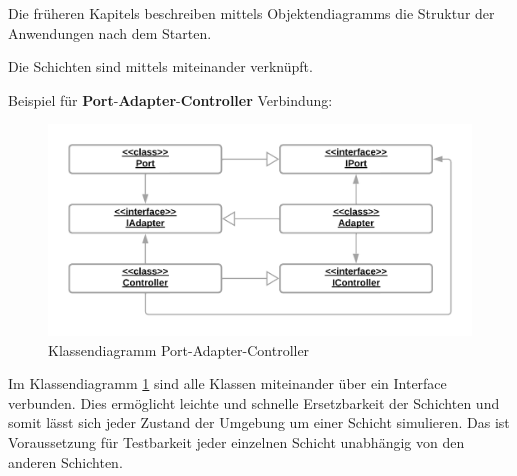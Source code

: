 Die früheren Kapitels beschreiben mittels Objektendiagramms die Struktur der Anwendungen nach dem Starten.

    Die Schichten sind mittels \textbf{} miteinander verknüpft.

    Beispiel für \textbf{Port}-\textbf{Adapter}-\textbf{Controller} Verbindung:

    \begin{figure}[H]
        \centering
        \includegraphics[width=12cm]{./images/Klassendiagramm Port-Adapter.png}
        \caption[Klassendiagramm Port-Adapter-Controller]{Klassendiagramm Port-Adapter-Controller \footnotemark}
        \label{fig:FullCDPAC}
    \end{figure}

    Im Klassendiagramm \ref{fig:FullCDPAC} sind alle Klassen miteinander über ein Interface verbunden.
    Dies ermöglicht leichte und schnelle Ersetzbarkeit der Schichten und 
    somit lässt sich jeder Zustand der Umgebung um einer Schicht simulieren. 
    Das ist Voraussetzung für Testbarkeit jeder einzelnen Schicht unabhängig von den anderen Schichten.